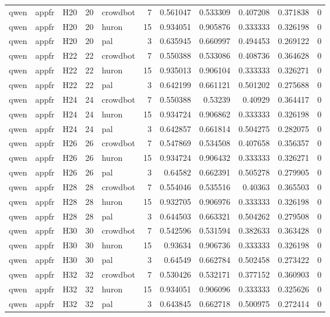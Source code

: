 \begin{longtable}{lllrlrrrrrr}
qwen & appfr & H20 & 20 & crowdbot & 7 & 0.561047 & 0.533309 & 0.407208 & 0.371838 & 0 \\
qwen & appfr & H20 & 20 & huron & 15 & 0.934051 & 0.905876 & 0.333333 & 0.326198 & 0 \\
qwen & appfr & H20 & 20 & pal & 3 & 0.635945 & 0.660997 & 0.494453 & 0.269122 & 0 \\
qwen & appfr & H22 & 22 & crowdbot & 7 & 0.550388 & 0.533086 & 0.408736 & 0.364628 & 0 \\
qwen & appfr & H22 & 22 & huron & 15 & 0.935013 & 0.906104 & 0.333333 & 0.326271 & 0 \\
qwen & appfr & H22 & 22 & pal & 3 & 0.642199 & 0.661121 & 0.501202 & 0.275688 & 0 \\
qwen & appfr & H24 & 24 & crowdbot & 7 & 0.550388 & 0.53239 & 0.40929 & 0.364417 & 0 \\
qwen & appfr & H24 & 24 & huron & 15 & 0.934724 & 0.906862 & 0.333333 & 0.326198 & 0 \\
qwen & appfr & H24 & 24 & pal & 3 & 0.642857 & 0.661814 & 0.504275 & 0.282075 & 0 \\
qwen & appfr & H26 & 26 & crowdbot & 7 & 0.547869 & 0.534508 & 0.407658 & 0.356357 & 0 \\
qwen & appfr & H26 & 26 & huron & 15 & 0.934724 & 0.906432 & 0.333333 & 0.326271 & 0 \\
qwen & appfr & H26 & 26 & pal & 3 & 0.64582 & 0.662391 & 0.505278 & 0.279905 & 0 \\
qwen & appfr & H28 & 28 & crowdbot & 7 & 0.554046 & 0.535516 & 0.40363 & 0.365503 & 0 \\
qwen & appfr & H28 & 28 & huron & 15 & 0.932705 & 0.906976 & 0.333333 & 0.326198 & 0 \\
qwen & appfr & H28 & 28 & pal & 3 & 0.644503 & 0.663321 & 0.504262 & 0.279508 & 0 \\
qwen & appfr & H30 & 30 & crowdbot & 7 & 0.542596 & 0.531594 & 0.382633 & 0.363428 & 0 \\
qwen & appfr & H30 & 30 & huron & 15 & 0.93634 & 0.906736 & 0.333333 & 0.326198 & 0 \\
qwen & appfr & H30 & 30 & pal & 3 & 0.64549 & 0.662784 & 0.502458 & 0.273422 & 0 \\
qwen & appfr & H32 & 32 & crowdbot & 7 & 0.530426 & 0.532171 & 0.377152 & 0.360903 & 0 \\
qwen & appfr & H32 & 32 & huron & 15 & 0.934051 & 0.906096 & 0.333333 & 0.325626 & 0 \\
qwen & appfr & H32 & 32 & pal & 3 & 0.643845 & 0.662718 & 0.500975 & 0.272414 & 0 \\

\end{longtable}
